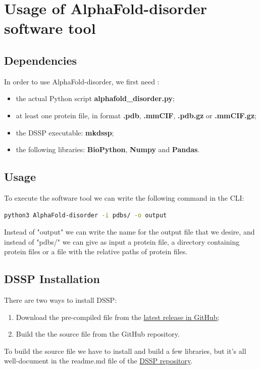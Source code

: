 \section{Usage of AlphaFold-disorder software tool}
\subsection{Dependencies}
In order to use AlphaFold-disorder, we first need :
\begin{itemize}
    \item the actual Python script \textbf{alphafold\_disorder.py};
    \item at least one protein file, in format \textbf{.pdb}, \textbf{.mmCIF}, \textbf{.pdb.gz} or \textbf{.mmCIF.gz};
    \item the DSSP executable: \textbf{mkdssp};
    \item the following libraries: \textbf{BioPython}, \textbf{Numpy} and \textbf{Pandas}.
\end{itemize}

\subsection{Usage}
To execute the software tool we can write the following command in the CLI:


\begin{lstlisting}[language=Bash]
    python3 AlphaFold-disorder -i pdbs/ -o output
\end{lstlisting}

\vspace{1em}

Instead of "output" we can write the name for the output file that we desire, and instead of "pdbs/" we can give as input a protein file, a directory containing protein files or a file with the relative paths of protein files.
\vspace{2em}
\subsection{DSSP Installation}
There are two ways to install DSSP: 
\begin{enumerate}
    \item Download the pre-compiled file from the  \href{https://github.com/PDB-REDO/dssp/releases/tag/v4.4.0}{latest release in GitHub};
    \item Build the the source file from the GitHub repository.
\end{enumerate}
To build the source file we have to install and build a few libraries, but it's all well-document in the readme.md file of the \href{https://github.com/PDB-REDO/dssp}{DSSP repository}. 


